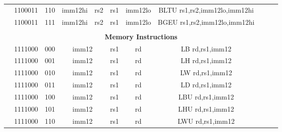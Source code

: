 \begin{table}[p]
\begin{small}
\begin{center}
\begin{tabular}{rcccccccccccl}
&
\multicolumn{1}{|c|}{1100011} &
\multicolumn{1}{c|}{110} &
\multicolumn{3}{c|}{imm12hi} &
\multicolumn{1}{c|}{rs2} &
\multicolumn{1}{c|}{rs1} &
\multicolumn{1}{c|}{imm12lo} & BLTU rs1,rs2,imm12lo,imm12hi \\
\cline{2-9}
  

&
\multicolumn{1}{|c|}{1100011} &
\multicolumn{1}{c|}{111} &
\multicolumn{3}{c|}{imm12hi} &
\multicolumn{1}{c|}{rs2} &
\multicolumn{1}{c|}{rs1} &
\multicolumn{1}{c|}{imm12lo} & BGEU rs1,rs2,imm12lo,imm12hi \\
\cline{2-9}
  

&
\multicolumn{11}{c}{} & \\
&
\multicolumn{11}{c}{\bf Memory Instructions} & \\
\cline{2-9}
  

&
\multicolumn{1}{|c|}{1111000} &
\multicolumn{1}{c|}{000} &
\multicolumn{4}{c|}{imm12} &
\multicolumn{1}{c|}{rs1} &
\multicolumn{1}{c|}{rd} & LB rd,rs1,imm12 \\
\cline{2-9}
  

&
\multicolumn{1}{|c|}{1111000} &
\multicolumn{1}{c|}{001} &
\multicolumn{4}{c|}{imm12} &
\multicolumn{1}{c|}{rs1} &
\multicolumn{1}{c|}{rd} & LH rd,rs1,imm12 \\
\cline{2-9}
  

&
\multicolumn{1}{|c|}{1111000} &
\multicolumn{1}{c|}{010} &
\multicolumn{4}{c|}{imm12} &
\multicolumn{1}{c|}{rs1} &
\multicolumn{1}{c|}{rd} & LW rd,rs1,imm12 \\
\cline{2-9}
  

&
\multicolumn{1}{|c|}{1111000} &
\multicolumn{1}{c|}{011} &
\multicolumn{4}{c|}{imm12} &
\multicolumn{1}{c|}{rs1} &
\multicolumn{1}{c|}{rd} & LD rd,rs1,imm12 \\
\cline{2-9}
  

&
\multicolumn{1}{|c|}{1111000} &
\multicolumn{1}{c|}{100} &
\multicolumn{4}{c|}{imm12} &
\multicolumn{1}{c|}{rs1} &
\multicolumn{1}{c|}{rd} & LBU rd,rs1,imm12 \\
\cline{2-9}
  

&
\multicolumn{1}{|c|}{1111000} &
\multicolumn{1}{c|}{101} &
\multicolumn{4}{c|}{imm12} &
\multicolumn{1}{c|}{rs1} &
\multicolumn{1}{c|}{rd} & LHU rd,rs1,imm12 \\
\cline{2-9}
  

&
\multicolumn{1}{|c|}{1111000} &
\multicolumn{1}{c|}{110} &
\multicolumn{4}{c|}{imm12} &
\multicolumn{1}{c|}{rs1} &
\multicolumn{1}{c|}{rd} & LWU rd,rs1,imm12 \\
\cline{2-9}
  


\end{tabular}
\end{center}
\end{small}
\end{table}
